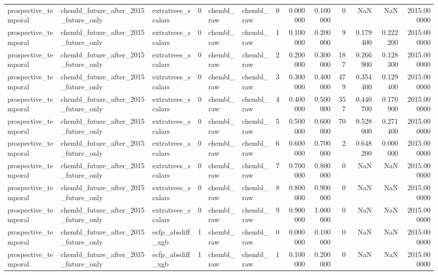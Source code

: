 \begin{longtable}{lllrllrrrrrrr}
prospective\_temporal & chembl\_future\_after\_2015\_future\_only & extratrees\_scalars & 0 & chembl\_raw & chembl\_raw & 0 & 0.000000 & 0.100000 & 0 & NaN & NaN & 2015.000000 \\
prospective\_temporal & chembl\_future\_after\_2015\_future\_only & extratrees\_scalars & 0 & chembl\_raw & chembl\_raw & 1 & 0.100000 & 0.200000 & 9 & 0.179400 & 0.222200 & 2015.000000 \\
prospective\_temporal & chembl\_future\_after\_2015\_future\_only & extratrees\_scalars & 0 & chembl\_raw & chembl\_raw & 2 & 0.200000 & 0.300000 & 187 & 0.266900 & 0.128300 & 2015.000000 \\
prospective\_temporal & chembl\_future\_after\_2015\_future\_only & extratrees\_scalars & 0 & chembl\_raw & chembl\_raw & 3 & 0.300000 & 0.400000 & 479 & 0.354400 & 0.129400 & 2015.000000 \\
prospective\_temporal & chembl\_future\_after\_2015\_future\_only & extratrees\_scalars & 0 & chembl\_raw & chembl\_raw & 4 & 0.400000 & 0.500000 & 357 & 0.440700 & 0.170900 & 2015.000000 \\
prospective\_temporal & chembl\_future\_after\_2015\_future\_only & extratrees\_scalars & 0 & chembl\_raw & chembl\_raw & 5 & 0.500000 & 0.600000 & 70 & 0.528000 & 0.271400 & 2015.000000 \\
prospective\_temporal & chembl\_future\_after\_2015\_future\_only & extratrees\_scalars & 0 & chembl\_raw & chembl\_raw & 6 & 0.600000 & 0.700000 & 2 & 0.648200 & 0.000000 & 2015.000000 \\
prospective\_temporal & chembl\_future\_after\_2015\_future\_only & extratrees\_scalars & 0 & chembl\_raw & chembl\_raw & 7 & 0.700000 & 0.800000 & 0 & NaN & NaN & 2015.000000 \\
prospective\_temporal & chembl\_future\_after\_2015\_future\_only & extratrees\_scalars & 0 & chembl\_raw & chembl\_raw & 8 & 0.800000 & 0.900000 & 0 & NaN & NaN & 2015.000000 \\
prospective\_temporal & chembl\_future\_after\_2015\_future\_only & extratrees\_scalars & 0 & chembl\_raw & chembl\_raw & 9 & 0.900000 & 1.000000 & 0 & NaN & NaN & 2015.000000 \\
prospective\_temporal & chembl\_future\_after\_2015\_future\_only & ecfp\_absdiff\_xgb & 1 & chembl\_raw & chembl\_raw & 0 & 0.000000 & 0.100000 & 0 & NaN & NaN & 2015.000000 \\
prospective\_temporal & chembl\_future\_after\_2015\_future\_only & ecfp\_absdiff\_xgb & 1 & chembl\_raw & chembl\_raw & 1 & 0.100000 & 0.200000 & 0 & NaN & NaN & 2015.000000 \\

\end{longtable}
